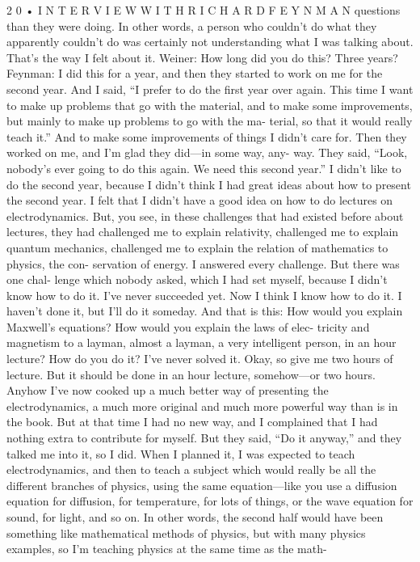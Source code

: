 \documentclass[11pt,oneside]{article}
\begin{document}
2 0 • I N T E R V I E W  W I T H  R I C H A R D  F E Y N M A N questions than they were doing. In other words, a person who couldn’t do what they apparently couldn’t do was certainly not understanding what I was talking about. That’s the way I felt about it. Weiner: How long did you do this? Three years? Feynman: I did this for a year, and then they started to work on me for the second year. And I said, “I prefer to do the first year over again. This time I want to make up problems that go with the material, and to make some improvements, but mainly to make up problems to go with the ma- terial, so that it would really teach it.” And to make some improvements of things I didn’t care for. Then they worked on me, and I’m glad they did---in some way, any- way. They said, “Look, nobody’s ever going to do this again. We need this second year.” I didn’t like to do the second year, because I didn’t think I had great ideas about how to present the second year. I felt that I didn’t have a good idea on how to do lectures on electrodynamics. But, you see, in these challenges that had existed before about lectures, they had challenged me to explain relativity, challenged me to explain quantum mechanics, challenged me to explain the relation of mathematics to physics, the con- servation of energy. I answered every challenge. But there was one chal- lenge which nobody asked, which I had set myself, because I didn’t know how to do it. I’ve never succeeded yet. Now I think I know how to do it. I haven’t done it, but I’ll do it someday. And that is this: How would you explain Maxwell’s equations? How would you explain the laws of elec- tricity and magnetism to a layman, almost a layman, a very intelligent person, in an hour lecture? How do you do it? I’ve never solved it. Okay, so give me two hours of lecture. But it should be done in an hour lecture, somehow---or two hours. Anyhow I’ve now cooked up a much better way of presenting the electrodynamics, a much more original and much more powerful way than is in the book. But at that time I had no new way, and I complained that I had nothing extra to contribute for myself. But they said, “Do it anyway,” and they talked me into it, so I did. When I planned it, I was expected to teach electrodynamics, and then to teach a subject which would really be all the different branches of physics, using the same equation---like you use a diffusion equation for diffusion, for temperature, for lots of things, or the wave equation for sound, for light, and so on. In other words, the second half would have been something like mathematical methods of physics, but with many physics examples, so I’m teaching physics at the same time as the math-\par
\end{document}
